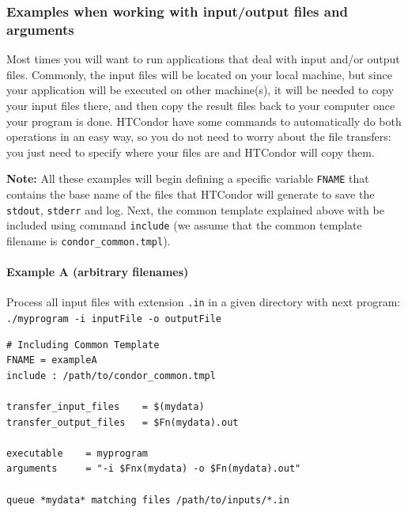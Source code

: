 \documentclass[a4paper,10pt]{article}
\begin{document}
\subsubsection{Examples when working with input/output files and arguments}
\label{sec:org3e713b5}

Most times you will want to run applications that deal with input and/or output
files. Commonly, the input files will be located on your local machine, but
since your application will be executed on other machine(s), it will be needed
to copy your input files there, and then copy the result files back to your
computer once your program is done. HTCondor have some commands to automatically
do both operations in an easy way, so you do not need to worry about the file
transfers: you just need to specify where your files are and HTCondor will copy
them.

\textbf{Note:} All these examples will begin defining a specific variable \texttt{FNAME} that
contains the base name of the files that HTCondor will generate to save the
\texttt{stdout}, \texttt{stderr} and log. Next, the common template explained above with be
included using command \texttt{include} (we assume that the common template filename is
\texttt{condor\_common.tmpl}).

\paragraph{\textbf{Example A} (arbitrary filenames)}
\label{sec:orgaea4694}

Process all input files with extension \texttt{.in} in a given directory with next
program: \texttt{./myprogram -i inputFile -o outputFile}

\begin{verbatim}
# Including Common Template
FNAME = exampleA
include : /path/to/condor_common.tmpl

transfer_input_files    = $(mydata)
transfer_output_files   = $Fn(mydata).out

executable    = myprogram
arguments     = "-i $Fnx(mydata) -o $Fn(mydata).out"

queue *mydata* matching files /path/to/inputs/*.in
\end{verbatim}
\end{document}
